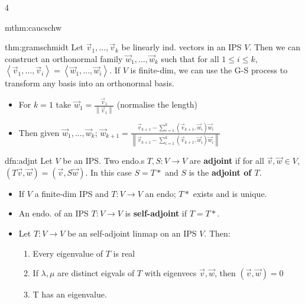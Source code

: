 \documentclass[landscape, 8pt]{extarticle}
\begin{document}
\begin{multicols*}{4}
\begin{mthm}{mthm:caucschw}{ }
		\end{mthm}
		
		
		\begin{thm}{thm:gramschmidt}{ }
			Let $\vec{v}_1, \dots, \vec{v}_k$ be linearly ind. vectors in an IPS $V$. Then we can construct an orthonormal family $\vec{w}_1, \dots, \vec{w}_k$ such that for all $1 \le i \le k$, $\left\langle \vec{v}_1, \dots, \vec{v}_i\right\rangle = \left\langle \vec{w}_1, \dots, \vec{w}_i\right\rangle$. If $V$ is finite-dim, we can use the G-S process to transform any basis into an orthonormal basis.\\
			
			\begin{itemize}
				\item For $k = 1$ take $\vec{w}_1 = \frac{\vec{v}_1}{\left\lVert \vec{v}_1\right\rVert}$ (normalise the length)
				\item Then given $\vec{w}_1, \dots, \vec{w}_k$; $\vec{w}_{k+1} = \frac{\vec{v}_{k+1} - \sum_{i=1}^{k}(\vec{v}_{k+1}, \vec{w}_i)\vec{w}_i}{\left\lVert\vec{v}_{k+1} - \sum_{i=1}^{k}(\vec{v}_{k+1}, \vec{w}_i)\vec{w}_i\right\rVert}$
			\end{itemize}
			
		\end{thm}
		
		
		\begin{dfn}{dfn:adjnt}{ }
			Let $V$ be an IPS. Two endo.s $T, S : V \to V$ are \textbf{adjoint} if for all $\vec{v}, \vec{w} \in V$, $(T \vec{v}, \vec{w}) = (\vec{v}, S\vec{w})$. In this case $S = T*$ and $S$ is the \textbf{adjoint of $T$}.
			\begin{itemize}
				\item If $V$ a finite-dim IPS and $T: V \to V$ an endo; $T*$ exists and is unique.
				\item An endo. of an IPS $T : V \to V$ is \textbf{self-adjoint} if $T = T*$.
				\item Let $T : V \to V$ be an self-adjoint linmap on an IPS $V$. Then:
					\begin{enumerate}[label=(\arabic*)]
						\item Every eigenvalue of $T$ is real
						\item If $\lambda, \mu$ are distinct eigvals of $T$ with eigenvecs $\vec{v}, \vec{w}$, then $(\vec{v}, \vec{w}) = 0$
						\item T has an eigenvalue.
					\end{enumerate}
			\end{itemize}
			

\end{dfn}
\end{multicols*}
\end{document}
